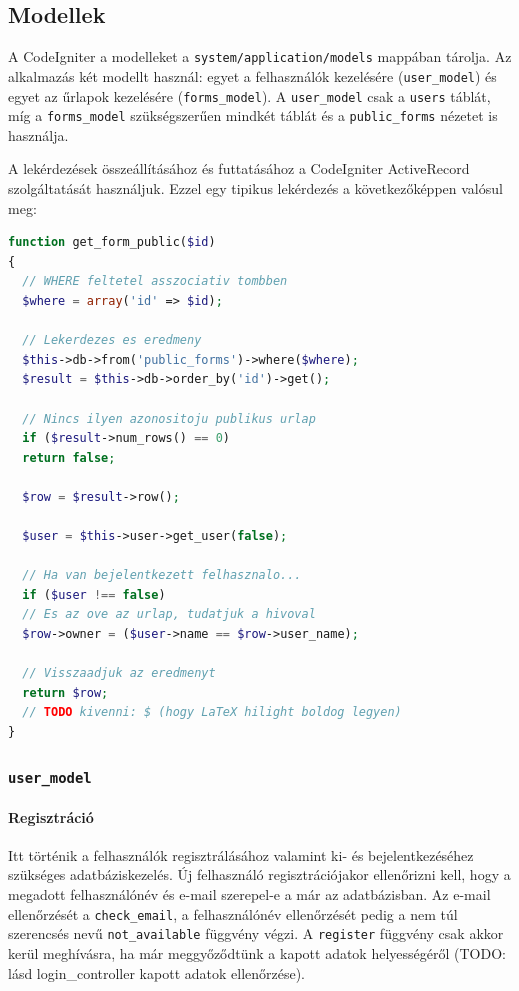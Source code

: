 \documentclass[12pt,a4paper,twoside]{article}
\begin{document}
\subsection{Modellek}

A CodeIgniter a modelleket a \texttt{system/application/models} mappában
tárolja. Az alkalmazás két modellt használ: egyet a felhasználók kezelésére
(\texttt{user\_model}) és egyet az űrlapok kezelésére (\texttt{forms\_model}). A
\texttt{user\_model} csak a \texttt{users} táblát, míg a
\texttt{forms\_model} szükségszerűen mindkét táblát és a \texttt{public\_forms}
nézetet is használja.

A lekérdezések összeállításához és futtatásához a CodeIgniter ActiveRecord
szolgáltatását használjuk. Ezzel egy tipikus lekérdezés a következőképpen
valósul meg:

\begin{lstlisting}[language=PHP]
function get_form_public($id)
{
  // WHERE feltetel asszociativ tombben
  $where = array('id' => $id);

  // Lekerdezes es eredmeny
  $this->db->from('public_forms')->where($where);
  $result = $this->db->order_by('id')->get();

  // Nincs ilyen azonositoju publikus urlap
  if ($result->num_rows() == 0)
  return false;

  $row = $result->row();

  $user = $this->user->get_user(false);

  // Ha van bejelentkezett felhasznalo...
  if ($user !== false)
  // Es az ove az urlap, tudatjuk a hivoval
  $row->owner = ($user->name == $row->user_name);

  // Visszaadjuk az eredmenyt
  return $row;
  // TODO kivenni: $ (hogy LaTeX hilight boldog legyen)
}
\end{lstlisting}

\subsubsection{\texttt{user\_model}}

\paragraph{Regisztráció}
Itt történik a felhasználók regisztrálásához valamint ki- és bejelentkezéséhez
szükséges adatbáziskezelés. Új felhasználó regisztrációjakor ellenőrizni
kell, hogy a megadott felhasználónév és e-mail szerepel-e a már az
adatbázisban. Az e-mail ellenőrzését a \texttt{check\_email}, a felhasználónév
ellenőrzését pedig a nem túl szerencsés nevű \texttt{not\_available} függvény
végzi. A \texttt{register} függvény csak akkor kerül meghívásra, ha már
meggyőződtünk a kapott adatok helyességéről (TODO: lásd login\_controller kapott
adatok ellenőrzése).
\end{document}
